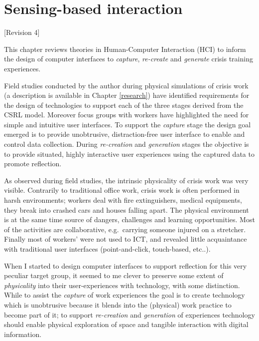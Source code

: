 \chapter{Sensing-based interaction}\label{interaction}

{[}Revision 4{]}

This chapter reviews theories in Human-Computer Interaction (HCI) to
inform the design of computer interfaces to \emph{capture},
\emph{re-create} and \emph{generate} crisis training experiences.

Field studies conducted by the author during physical simulations of
crisis work (a description is available in Chapter \ref{research}) have
identified requirements for the design of technologies to support each
of the three stages derived from the CSRL model. Moreover focus groups
with workers have highlighted the need for simple and intuitive user
interfaces. To support the \emph{capture} stage the design goal emerged
is to provide unobtrusive, distraction-free user interface to enable and
control data collection. During \emph{re-creation} and \emph{generation}
stages the objective is to provide situated, highly interactive user
experiences using the captured data to promote reflection.

As observed during field studies, the intrinsic physicality of crisis
work was very visible. Contrarily to traditional office work, crisis
work is often performed in harsh environments; workers deal with fire
extinguishers, medical equipments, they break into crashed cars and
houses falling apart. The physical environment is at the same time
source of dangers, challenges and learning opportunities. Most of the
activities are collaborative, e.g.~carrying someone injured on a
stretcher. Finally most of workers' were not used to ICT, and revealed
little acquaintance with traditional user interfaces (point-and-click,
touch-based, etc..).

When I started to design computer interfaces to support reflection for
this very peculiar target group, it seemed to me clever to preserve some
extent of \emph{physicality} into their user-experiences with
technology, with some distinction. While to assist the \emph{capture} of
work experiences the goal is to create technology which is unobtrusive
because it blends into the (physical) work practice to become part of
it; to support \emph{re-creation} and \emph{generation} of experiences
technology should enable physical exploration of space and tangible
interaction with digital information.

